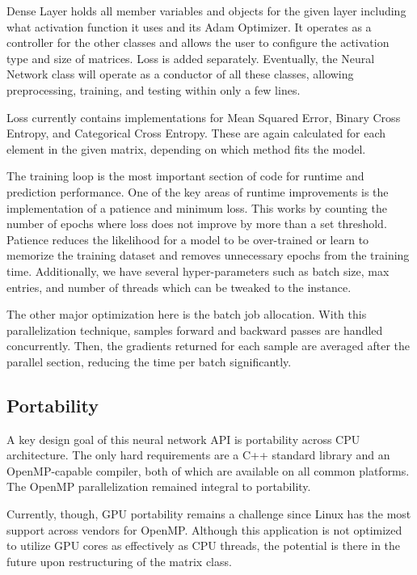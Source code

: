 \documentclass[journal]{IEEEtran}
\begin{document}
\par Dense Layer holds all member variables and objects for the given layer including what activation function it uses and its Adam Optimizer. It operates as a controller for the other classes and allows the user to configure the activation type and size of matrices. Loss is added separately. Eventually, the Neural Network class will operate as a conductor of all these classes, allowing preprocessing, training, and testing within only a few lines.
\par Loss currently contains implementations for Mean Squared Error, Binary Cross Entropy, and Categorical Cross Entropy. These are again calculated for each element in the given matrix, depending on which method fits the model.
\par The training loop is the most important section of code for runtime and prediction performance. One of the key areas of runtime improvements is the implementation of a patience and minimum loss. This works by counting the number of epochs where loss does not improve by more than a set threshold. Patience reduces the likelihood for a model to be over-trained or learn to memorize the training dataset and removes unnecessary epochs from the training time. Additionally, we have several hyper-parameters such as batch size, max entries, and number of threads which can be tweaked to the instance.
\par The other major optimization here is the batch job allocation. With this parallelization technique, samples forward and backward passes are handled concurrently. Then, the gradients returned for each sample are averaged after the parallel section, reducing the time per batch significantly. 

\subsection{Portability}
\par A key design goal of this neural network API is portability across CPU architecture. The only hard requirements are a C++ standard library and an OpenMP-capable compiler, both of which are available on all common platforms. The OpenMP parallelization remained integral to portability. 
\par Currently, though, GPU portability remains a challenge since Linux has the most support across vendors for OpenMP. Although this application is not optimized to utilize GPU cores as effectively as CPU threads, the potential is there in the future upon restructuring of the matrix class.
\end{document}
